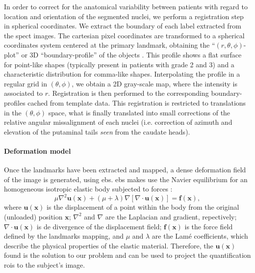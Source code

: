 \documentclass{frontiers}
\newcommand{\vect}[1]{\ensuremath{\mathbf{#1}}}
\begin{document}
\cbstart
In order to correct for the anatomical variability between patients with regard to location and orientation of the segmented nuclei, we
  perform a registration step in spherical coordinates.
\cbend
We extract the boundary of each label extracted from the \gls*{spect} images. The cartesian pixel coordinates are
  transformed to a spherical coordinates system centered at the primary 
  landmark, obtaining the ``$(r,\theta,\phi)$-plot'' or 3D ``boundary-profile''
  of the objects \citep{davies_computer_2012}.
This profile shows a flat surface for point-like shapes (typically
  present in patients with grade 2 and 3) and a characteristic distribution for
  comma-like shapes. Interpolating the profile in a regular grid in $(\theta,\phi)$, 
  we obtain a 2D gray-scale map, where the intensity is associated to $r$.
Registration is then performed to the corresponding boundary-profiles cached from
  template data. This registration is restricted to translations in the
  $(\theta,\phi)$ space, what is finally translated into small corrections of
  the relative angular missalignment of each nuclei (i.e. correction of
  azimuth and elevation of the putaminal tails \emph{seen} from the caudate heads).

\paragraph{Deformation model}
\label{sec:deformation}
Once the landmarks have been extracted and mapped, a dense deformation field of the image
  is generated, using \gls*{ebs}. \gls*{ebs} makes use the Navier 
  equilibrium  for an homogeneous isotropic elastic body
  subjected to forces \citep{davis_physics-based_1997}:
  \begin{equation}
    \label{eq:ebs_pde}
    \mu \nabla^2 \vect{u}(\vect{x}) + (\mu+\lambda) \nabla \left[ \nabla \cdot \vect{u}(\vect{x}) \right] = \vect{f}(\vect{x}),
  \end{equation}
  where $\vect{u}(\vect{x})$ is the displacement of a point within the body
  from the original (unloaded) position $\vect{x}$; $\nabla^2$ and $\nabla$
  are the Laplacian and gradient, repectively; $\nabla \cdot \vect{u}(\vect{x})$
  is de divergence of the displacement field; $\vect{f}(\vect{x})$ is the force
  field defined by the landmarks mapping, and $\mu$ and $\lambda$ are the Lam\'e
  coefficients, which describe the physical properties of the elastic material.
Therefore, the $\vect{u}(\vect{x})$ found is the solution to our problem and
  can be used to project the quantification \glspl*{roi} to the subject's image.
\end{document}
